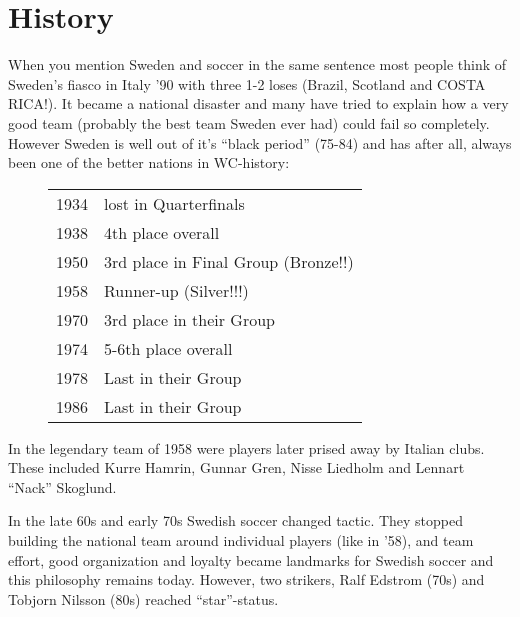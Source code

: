 \section{History}
When you mention Sweden and soccer in the same sentence most people think of 
Sweden's fiasco in Italy '90 with three 1-2 loses (Brazil, Scotland and COSTA 
RICA!). It became a national disaster and many have tried to explain how a very
good team (probably the best team Sweden ever had) could fail so completely.
However Sweden is well out of it's ``black period'' (75-84) and has after all,
always been one of the better nations in WC-history:
\begin{figure}[H]
\begin{tabular}{c l}
1934 & lost in Quarterfinals \\
1938 & 4th place overall \\
1950 & 3rd place in Final Group (Bronze!!) \\
1958 & Runner-up (Silver!!!) \\
1970 & 3rd place in their Group \\
1974 & 5-6th place overall \\
1978 & Last in their Group \\
1986 & Last in their Group \\
\end{tabular}
\end{figure}
In the legendary team of 1958 were players later prised away by Italian clubs.
These included Kurre Hamrin, Gunnar Gren, Nisse Liedholm and Lennart ``Nack'' 
Skoglund.

In the late 60s and early 70s Swedish soccer changed tactic. They stopped
building the national team around individual players (like in '58), and team 
effort, good organization and loyalty became landmarks for Swedish soccer and 
this philosophy remains today. However, two strikers, Ralf Edstrom (70s) and 
Tobjorn Nilsson (80s) reached ``star''-status.

